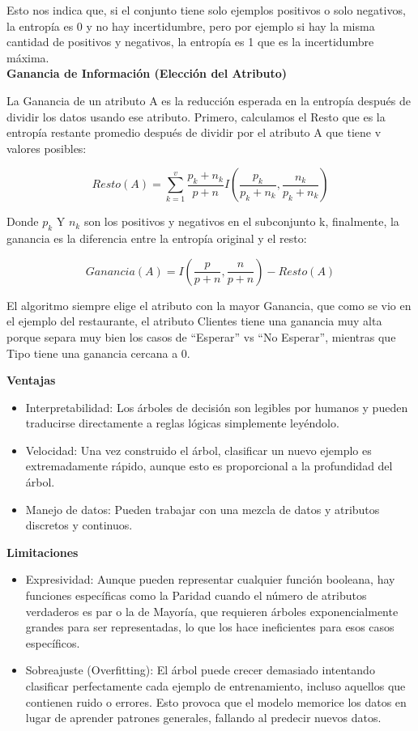 \documentclass[letterpaper,12pt]{article}
\begin{document}
\begin{itemize}
    Esto nos indica que, si el conjunto tiene solo ejemplos positivos o solo negativos, la entropía es 0 y no hay incertidumbre, pero por ejemplo si hay la misma cantidad de positivos y negativos, la entropía es 1 que es la incertidumbre máxima.\\
    
    \textbf{Ganancia de Información (Elección del Atributo)}
    
    La Ganancia de un atributo A es la reducción esperada en la entropía después de dividir los datos usando ese atributo. Primero, calculamos el Resto que es la entropía restante promedio después de dividir por el atributo A que tiene v valores posibles:
    
    $$Resto(A)=\sum_{k=1}^{v}\frac{p_{k}+n_{k}}{p+n}I\left(\frac{p_{k}}{p_{k}+n_{k}},\frac{n_{k}}{p_{k}+n_{k}}\right)$$
    
    Donde $p_{k}$ Y $n_{k}$ son los positivos y negativos en el subconjunto k, finalmente, la ganancia es la diferencia entre la entropía original y el resto:
    
    $$Ganancia(A)=I\left(\frac{p}{p+n},\frac{n}{p+n}\right)-Resto(A)$$
    
    El algoritmo siempre elige el atributo con la mayor Ganancia, que como se vio en el ejemplo del restaurante, el atributo Clientes tiene una ganancia muy alta porque separa muy bien los casos de ``Esperar'' vs ``No Esperar'', mientras que Tipo tiene una ganancia cercana a 0.

    \textbf{Ventajas}
    \begin{itemize}
        \item Interpretabilidad: Los árboles de decisión son legibles por humanos y pueden traducirse directamente a reglas lógicas simplemente leyéndolo.
        \item Velocidad: Una vez construido el árbol, clasificar un nuevo ejemplo es extremadamente rápido, aunque esto es proporcional a la profundidad del árbol.
        \item Manejo de datos: Pueden trabajar con una mezcla de datos y atributos discretos y continuos.\\
    \end{itemize}
    
    \textbf{Limitaciones}
    \begin{itemize}
        \item Expresividad: Aunque pueden representar cualquier función booleana, hay funciones específicas como la Paridad cuando el número de atributos verdaderos es par o la de Mayoría, que requieren árboles exponencialmente grandes para ser representadas, lo que los hace ineficientes para esos casos específicos.
        \item Sobreajuste (Overfitting): El árbol puede crecer demasiado intentando clasificar perfectamente cada ejemplo de entrenamiento, incluso aquellos que contienen ruido o errores. Esto provoca que el modelo memorice los datos en lugar de aprender patrones generales, fallando al predecir nuevos datos.\\
        

\end{itemize}
\end{itemize}
\end{document}
